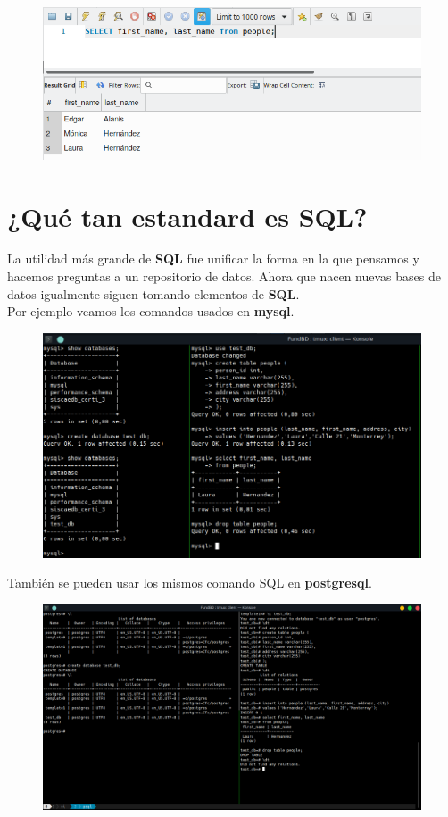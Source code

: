 \documentclass{article}
\begin{document}
\begin{figure}[h!]
  \centering
  \includegraphics[scale=0.75]{./Pictures/064_select.png}
\end{figure}

\section{¿Qué tan estandard es SQL?}%
La utilidad más grande de \textbf{SQL} fue unificar la forma en la que pensamos
y hacemos preguntas a un repositorio de datos. Ahora que nacen nuevas bases de
datos igualmente siguen tomando elementos de \textbf{SQL}.\\

Por ejemplo veamos los comandos usados en \textbf{mysql}.
\begin{figure}[h!]
  \centering
  \includegraphics[scale=0.75]{./Pictures/065_mysql.png}
\end{figure}

También se pueden usar los mismos comando SQL en \textbf{postgresql}.
\begin{figure}[h!]
  \centering
  \includegraphics[scale=0.50]{./Pictures/066_postgresql.png}
\end{figure}
\end{document}

